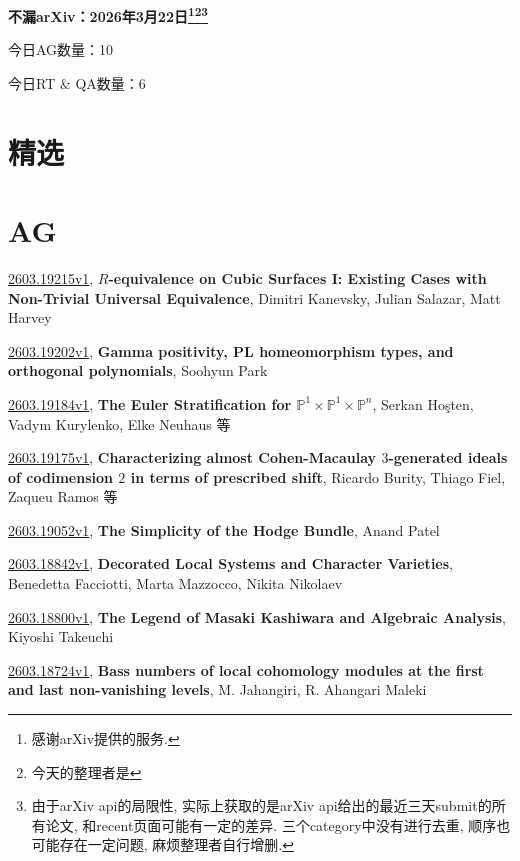 \documentclass[9pt, a4paper]{article}
\theoremstyle{plain}
\theoremstyle{definition}
\theoremstyle{remark}
\newcommand{\arxiv}[3]{\href{https://arxiv.org/abs/#1}{#1}, \textbf{\textcolor{arxivblue}{#2}}, #3}
\newcommand{\AGnumber}{10}
\newcommand{\RTQAnumber}{6}
\newcommand{\NewestDate}{2026年3月22日}
\newcommand{\todayarXiver}{} %
\begin{document}
\begin{center}
    \Huge\textbf{不漏arXiv：\NewestDate\footnote{感谢arXiv提供的服务.}\footnote{今天的整理者是\todayarXiver}\footnote{由于arXiv api的局限性, 实际上获取的是arXiv api给出的最近三天submit的所有论文, 和recent页面可能有一定的差异. 三个category中没有进行去重, 顺序也可能存在一定问题, 麻烦整理者自行增删.}} \\
\end{center}

\setcounter{section}{-1}

\begin{center}
    今日AG数量：\AGnumber
    
    今日RT \& QA数量：\RTQAnumber
    
\end{center}


\section{精选}


\section{AG}
\arxiv{2603.19215v1}{$R$-equivalence on Cubic Surfaces I: Existing Cases with Non-Trivial Universal Equivalence}{Dimitri Kanevsky, Julian Salazar, Matt Harvey}

\arxiv{2603.19202v1}{Gamma positivity, PL homeomorphism types, and orthogonal polynomials}{Soohyun Park}

\arxiv{2603.19184v1}{The Euler Stratification for $\mathbb{P}^1 \times \mathbb{P}^1 \times \mathbb{P}^n$}{Serkan Hoşten, Vadym Kurylenko, Elke Neuhaus 等}

\arxiv{2603.19175v1}{Characterizing almost Cohen-Macaulay $3$-generated ideals of codimension $2$ in terms of prescribed shift}{Ricardo Burity, Thiago Fiel, Zaqueu Ramos 等}

\arxiv{2603.19052v1}{The Simplicity of the Hodge Bundle}{Anand Patel}

\arxiv{2603.18842v1}{Decorated Local Systems and Character Varieties}{Benedetta Facciotti, Marta Mazzocco, Nikita Nikolaev}

\arxiv{2603.18800v1}{The Legend of Masaki Kashiwara and Algebraic Analysis}{Kiyoshi Takeuchi}

\arxiv{2603.18724v1}{Bass numbers of local cohomology modules at the first and last non-vanishing levels}{M. Jahangiri, R. Ahangari Maleki}
\end{document}
